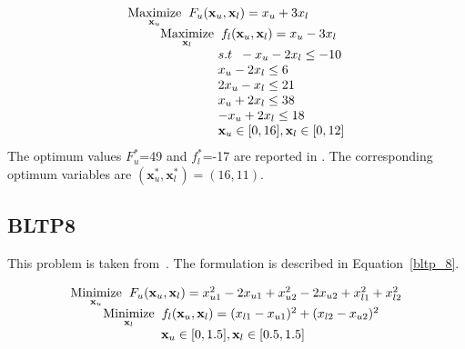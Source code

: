 \begin{equation}
\begin{array}{lr}
\underset{\mathbf{x}_u}{\text{Maximize}}\hspace{2mm} F_u(\mathbf{x}_u, \mathbf{ x}_l)=x_u+3x_l\\

\hspace{9mm} \underset{\mathbf{x}_l} {\text{Maximize}}\hspace{2mm} f_l(\mathbf{x}_u, \mathbf{ x}_l)=x_u-3x_l \\
\hspace{25mm}s.t\hspace{2mm} -x_u-2x_l\leq -10\\
\hspace{25mm} x_u-2x_l\leq 6\\
\hspace{25mm} 2x_u-x_l\leq 21\\
\hspace{25mm} x_u+2x_l\leq 38\\
\hspace{25mm} -x_u+2x_l\leq 18\\
\hspace{25mm} \mathbf{x}_u \in {[0,16]},\mathbf{x}_l \in [0,12] \\
\end{array}
\label{bltp_7}
\end{equation}
The optimum values $F_u^*$=49 and $f_l^*$=-17 are reported in \cite{Angelobilevel}. The corresponding optimum variables are $(\mathbf{x}^*_u, \mathbf{x}^*_l)=(16,11).$

\subsection{BLTP8}

This problem is taken from~\cite{falk1995bilevel}. The formulation is described in Equation~\ref{bltp_8}. 

\begin{equation}
\begin{array}{lr}
\underset{\mathbf{x}_u}{\text{Minimize}}\hspace{2mm} F_u(\mathbf{x}_u, \mathbf{ x}_l)=x_{u1}^2-2x_{u1}+x_{u2}^2-2x_{u2}+x_{l1}^2+x_{l2}^2\\


\hspace{9mm} \underset{\mathbf{x}_l} {\text{Minimize}}\hspace{2mm} f_l(\mathbf{x}_u, \mathbf{ x}_l)=(x_{l1}-x_{u1})^2+(x_{l2}-x_{u2})^2 \\

\hspace{25mm} \mathbf{x}_u \in {[0,1.5]},\mathbf{x}_l \in [0.5,1.5] \\
\end{array}
\label{bltp_8}
\end{equation}

